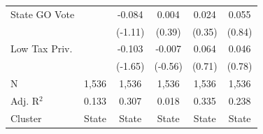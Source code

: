 \begin{tabular*}{\textwidth}{@{\extracolsep{\fill}}lccccc}
   State GO Vote        &               & -0.084         & 0.004        & 0.024         & 0.055\\   
                        &               & (-1.11)       & (0.39)      & (0.35)       & (0.84)\\   
   Low Tax Priv.        &               & -0.103         & -0.007       & 0.064         & 0.046\\   
                        &               & (-1.65)       & (-0.56)     & (0.71)       & (0.78)\\   
   \hline
   N         & 1,536         & 1,536          & 1,536        & 1,536         & 1,536\\  
   Adj. R$^2$       & 0.133         & 0.307          & 0.018        & 0.335         & 0.238\\  
   Cluster              & State & State & State & State & State\\  
   \bottomrule
\end{tabular*}
\par\endgroup
